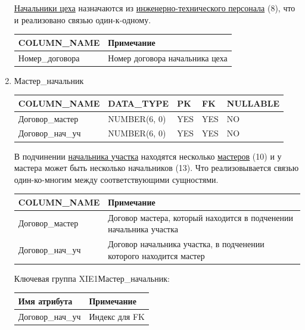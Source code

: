 \begin{enumerate}
    \underline{Начальники цеха} назначаются из \underline{инженерно-технического персонала} (8), что и реализовано связью один-к-одному.

    \begin{tabular}{|p{4cm}|p{5cm}|} \hline

        {\bf COLUMN\_NAME} & {\bf Примечание} \\ \hline
        Номер\_договора & Номер договора начальника цеха \\ \hline

    \end{tabular}

    \item Мастер\_начальник

    \begin{tabular}{|p{4cm}|p{3cm}|p{1cm}|p{1cm}|p{2cm}|} \hline

        {\bf COLUMN\_NAME} & {\bf DATA\_TYPE} & {\bf PK} & {\bf FK} & {\bf NULLABLE} \\ \hline
        Договор\_мастер & NUMBER(6, 0) & YES & YES & NO \\ \hline
        Договор\_нач\_уч & NUMBER(6, 0) & YES & YES & NO \\ \hline

    \end{tabular}

    В подчинении \underline{начальника участка} находятся несколько \underline{мастеров} (10) и у мастера может быть несколько начальников (13).
    Что реализовывается связью один-ко-многим между соответствующими сущностями.

    \begin{tabular}{|p{4cm}|p{5cm}|} \hline

        {\bf COLUMN\_NAME} & {\bf Примечание} \\ \hline
        Договор\_мастер & Договор мастера, который находится в подченении начальника участка \\ \hline
        Договор\_нач\_уч & Договор начальника участка, в подченении которого находится мастер \\ \hline

    \end{tabular}

    Ключевая группа XIE1Мастер\_начальник:

    \begin{tabular}{|p{4cm}|p{5cm}|} \hline

        {\bf Имя атрибута} & {\bf Примечание} \\ \hline
        Договор\_нач\_уч & Индекс для FK \\ \hline


\end{tabular}
\end{enumerate}
